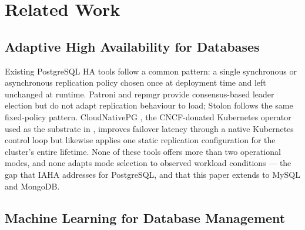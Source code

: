 \documentclass[pdflatex,sn-mathphys-num]{sn-jnl}
\theoremstyle{thmstyleone}
\theoremstyle{thmstylethree}
\begin{document}
\section{Related Work}\label{sec:related}

\subsection{Adaptive High Availability for Databases}\label{subsec:ha}

Existing PostgreSQL HA tools follow a common pattern: a single
synchronous or asynchronous replication policy chosen once at
deployment time and left unchanged at runtime. Patroni \cite{patroni}
and repmgr \cite{repmgr} provide consensus-based leader election but
do not adapt replication behaviour to load; Stolon \cite{stolon}
follows the same fixed-policy pattern. CloudNativePG \cite{cloudnativepg},
the CNCF-donated Kubernetes operator used as the substrate
in \cite{iaha2026}, improves failover latency through a native
Kubernetes control loop but likewise applies one static replication
configuration for the cluster's entire lifetime. None of these tools
offers more than two operational modes, and none adapts mode selection
to observed workload conditions --- the gap that IAHA \cite{iaha2026}
addresses for PostgreSQL, and that this paper extends to MySQL and
MongoDB.

\subsection{Machine Learning for Database Management}\label{subsec:ml4db}
\end{document}
